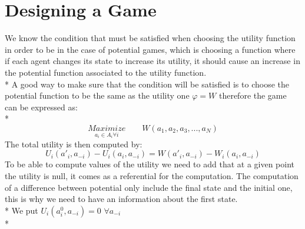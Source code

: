 \section{Designing a Game}
We know the condition that must be satisfied when choosing the utility function in order to be in the case of potential games, which is choosing a function where if each agent changes its state to increase its utility, it should cause an increase in the potential function associated to the utility function. \\*
A good way to make sure that the condition will be satisfied is to choose the potential function to be the same as the utility one $\varphi=W$ therefore the game can be expressed as: \\*
\begin{equation}
\underset{a_i \in A_i \forall i }{Maximize} \qquad W(a_1,a_2,a_3,...,a_N )
\end{equation}
The total utility is then computed by: 
\begin{equation}
U_i(a'_i,a_{-i})-U_i(a_i,a_{-i})=W(a'_i,a_{-i})-W_i(a_i,a_{-i})
\end{equation}
To be able to compute values of the utility we need to add that at a given point the utility is null, it comes as a referential for the computation. The computation of a difference between potential only include the final state and the initial one, this is why we need to have an information about the first state. \\* 
We put \hspace{5pt} $U_i(a_i^{0},a_{-i})=0$ \hspace{5pt} $ \forall a_{-i}$ \\*
